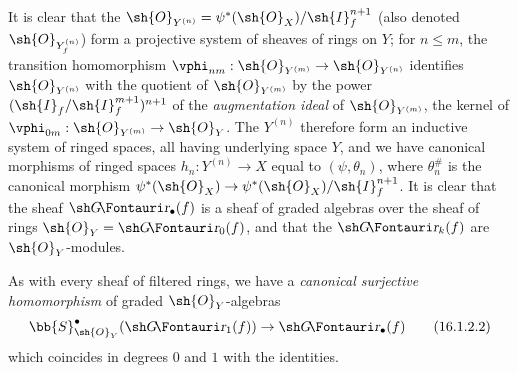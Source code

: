 It is clear that the $\sh{O}_{Y^{(n)}} = \psi^*(\sh{O}_X)/\sh{I}_f^{n+1}$ (also denoted $\sh{O}_{Y_f^{(n)}}$) form a
projective system of sheaves of rings on $Y$; for $n \leq m$, the transition homomorphism $\vphi_{nm}:\sh{O}_{Y^{(m)}} \to \sh{O}_{Y^{(n)}}$ identifies $\sh{O}_{Y^{(n)}}$ with the quotient of $\sh{O}_{Y^{(m)}}$ by the power $(\sh{I}_f/\sh{I}_f^{m+1})^{n+1}$ of the \emph{augmentation ideal} of $\sh{O}_{Y^{(m)}}$, the kernel of $\vphi_{0m}: \sh{O}_{Y^{(m)}} \to \sh{O}_{Y}$.
The $Y^{(n)}$ therefore form an inductive system of ringed spaces, all having underlying space $Y$, and we have canonical morphisms of ringed spaces $h_n: Y^{(n)} \to X$ equal to $(\psi, \theta_n)$, where $\theta^\#_n$ is the canonical morphism $\psi^*(\sh{O}_X) \to \psi^*(\sh{O}_X)/\sh{I}_f^{n+1}$.
It is clear that the sheaf $\shGr_\bullet(f)$ is a sheaf of graded algebras over the sheaf of rings $\sh{O}_Y = \shGr_0(f)$, and that the $\shGr_k(f)$ are $\sh{O}_Y$-modules.

As with every sheaf of filtered rings, we have a \emph{canonical surjective homomorphism} of graded $\sh{O}_Y$-algebras
\[
  \label{IV.16.1.2.2}
  \bb{S}_{\sh{O}_Y}^\bullet(\shGr_1(f)) \to \shGr_\bullet(f)
  \tag{16.1.2.2}
\]
which coincides in degrees $0$ and $1$ with the identities.

